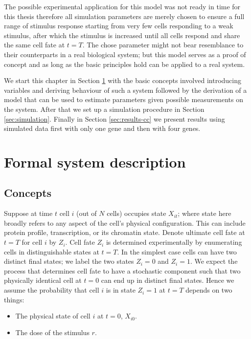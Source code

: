 The possible experimental application for this model was not ready in time for this thesis therefore all simulation parameters are merely chosen to ensure a full range of stimulus response starting from very few cells responding to a weak stimulus, after which the stimulus is increased until all cells respond and share the same cell fate at $t=T$. The chose parameter might not bear resemblance to their counterparts in a real biological system; but this model serves as a proof of concept and as long as the basic principles hold can be applied to a real system.

We start this chapter in Section \ref{sec:model-descr} with the basic concepts involved introducing variables and deriving  behaviour of such a system followed by the derivation of a model that can be used to estimate parameters given possible measurements on the system. After that we set up a simulation procedure in Section \ref{sec:simulation}. Finally in Section \ref{sec:results-cc} we present results using simulated data first with only one gene and then with four genes.

\section{Formal system description}
\label{sec:model-descr}

\subsection{Concepts}
\label{sec:concepts}


Suppose at time $t$ cell $i$ (out of $N$ cells) occupies state $X_{it}$; where state here broadly refers to any aspect of the cell's physical configuration. This can include protein profile, transcription, or its chromatin state. Denote ultimate cell fate at $t=T$ for cell $i$ by $Z_i$. Cell fate $Z_i$ is determined experimentally by enumerating cells in distinguishable states at $t=T$. In the simplest case cells can have two distinct final states; we label the two states $Z_i = 0$ and $Z_i = 1$. We expect the process that determines cell fate to have a stochastic component such that two physically identical cell at $t=0$ can end up in distinct final states. Hence we assume the probability that cell $i$ is in state $Z_i = 1$ at $t=T$ depends on two things:

\begin{itemize}
\item The physical state of cell $i$ at $t=0$, $X_{i0}$.
\item The dose of the stimulus $r$. 
\end{itemize}

